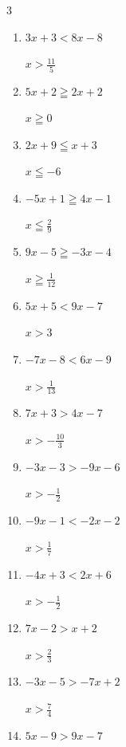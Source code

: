 \begin{multicols}{3}
\begin{enumerate}
        $\displaystyle x\geqq 5$

  \item $3x+3<8x-8$

        $\displaystyle x>\frac{11}{5}$

  \item $5x+2\geqq 2x+2$

        $\displaystyle x\geqq 0$

  \item $2x+9\leqq x+3$

        $\displaystyle x\leqq -6$

  \item $-5x+1\geqq 4x-1$

        $\displaystyle x\leqq \frac{2}{9}$

  \item $9x-5\geqq -3x-4$

        $\displaystyle x\geqq \frac{1}{12}$

  \item $5x+5<9x-7$

        $\displaystyle x>3$

  \item $-7x-8<6x-9$

        $\displaystyle x>\frac{1}{13}$

  \item $7x+3>4x-7$

        $\displaystyle x>-\frac{10}{3}$

\columnbreak %

\resetques

  \item $-3x-3>-9x-6$

        $\displaystyle x>-\frac{1}{2}$

  \item $-9x-1<-2x-2$

        $\displaystyle x>\frac{1}{7}$

  \item $-4x+3<2x+6$

        $\displaystyle x>-\frac{1}{2}$

  \item $7x-2>x+2$

        $\displaystyle x>\frac{2}{3}$

  \item $-3x-5>-7x+2$

        $\displaystyle x>\frac{7}{4}$

  \item $5x-9>9x-7$


\end{enumerate}
\end{multicols}
